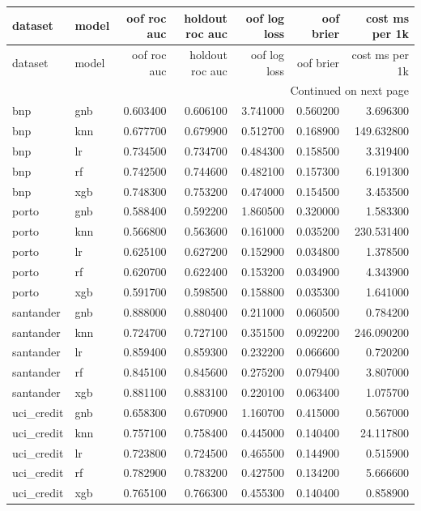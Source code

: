 \begin{center}\label{tab:s2model}\end{center}
\begingroup\scriptsize\setlength{\tabcolsep}{2.5pt}
\begin{longtable}{llrrrrr}
\toprule
dataset & model & oof roc auc & holdout roc auc & oof log loss & oof brier & cost ms per 1k \\
\midrule
\endfirsthead
\toprule
dataset & model & oof roc auc & holdout roc auc & oof log loss & oof brier & cost ms per 1k \\
\midrule
\endhead
\midrule
\multicolumn{7}{r}{Continued on next page} \\
\midrule
\endfoot
\bottomrule
\endlastfoot
bnp & gnb & 0.603400 & 0.606100 & 3.741000 & 0.560200 & 3.696300 \\
bnp & knn & 0.677700 & 0.679900 & 0.512700 & 0.168900 & 149.632800 \\
bnp & lr & 0.734500 & 0.734700 & 0.484300 & 0.158500 & 3.319400 \\
bnp & rf & 0.742500 & 0.744600 & 0.482100 & 0.157300 & 6.191300 \\
bnp & xgb & 0.748300 & 0.753200 & 0.474000 & 0.154500 & 3.453500 \\
porto & gnb & 0.588400 & 0.592200 & 1.860500 & 0.320000 & 1.583300 \\
porto & knn & 0.566800 & 0.563600 & 0.161000 & 0.035200 & 230.531400 \\
porto & lr & 0.625100 & 0.627200 & 0.152900 & 0.034800 & 1.378500 \\
porto & rf & 0.620700 & 0.622400 & 0.153200 & 0.034900 & 4.343900 \\
porto & xgb & 0.591700 & 0.598500 & 0.158800 & 0.035300 & 1.641000 \\
santander & gnb & 0.888000 & 0.880400 & 0.211000 & 0.060500 & 0.784200 \\
santander & knn & 0.724700 & 0.727100 & 0.351500 & 0.092200 & 246.090200 \\
santander & lr & 0.859400 & 0.859300 & 0.232200 & 0.066600 & 0.720200 \\
santander & rf & 0.845100 & 0.845600 & 0.275200 & 0.079400 & 3.807000 \\
santander & xgb & 0.881100 & 0.883100 & 0.220100 & 0.063400 & 1.075700 \\
uci\_credit & gnb & 0.658300 & 0.670900 & 1.160700 & 0.415000 & 0.567000 \\
uci\_credit & knn & 0.757100 & 0.758400 & 0.445000 & 0.140400 & 24.117800 \\
uci\_credit & lr & 0.723800 & 0.724500 & 0.465500 & 0.144900 & 0.515900 \\
uci\_credit & rf & 0.782900 & 0.783200 & 0.427500 & 0.134200 & 5.666600 \\
uci\_credit & xgb & 0.765100 & 0.766300 & 0.455300 & 0.140400 & 0.858900 \\
\end{longtable}\endgroup\addtocounter{table}{-1}
